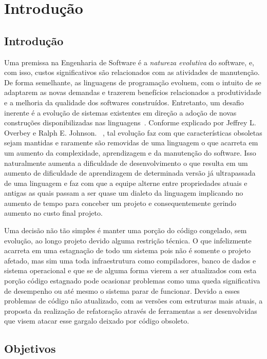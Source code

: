 \chapter{Introdução}
\section{Introdução}
Uma premissa na Engenharia de Software é a \emph{natureza evolutiva} do software, e, com isso, 
custos significativos são relacionados com as atividades de manutenção. De forma semelhante, 
as linguagens de programação evoluem, com o intuito de se adaptarem as novas demandas e trazerem 
benefícios relacionados a produtividade e a melhoria da qualidade dos softwares construídos. Entretanto, um 
desafio inerente é a evolução de sistemas existentes em direção a adoção de novas construções 
disponibilizadas nas linguagens~\cite{Dyer:2013}. Conforme explicado por Jeffrey L. Overbey e Ralph E. Johnson. ~\cite{Overbey:2009}, tal evolução faz com que características obsoletas sejam mantidas e raramente são removidas de uma linguagem o que acarreta em um aumento da complexidade, aprendizagem e da manutenção do software. Isso naturalmente aumenta a dificuldade de desenvolvimento o que resulta em um aumento de dificuldade de aprendizagem de determinada versão já ultrapassada de uma linguagem e faz com que a equipe alterne entre propriedades atuais e antigas as quais passam a ser quase um dialeto da linguagem implicando no aumento de tempo para conceber um projeto e consequentemente gerindo aumento no custo final projeto.

Uma decisão não tão simples é manter uma porção do código congelado, sem evolução, ao longo projeto devido alguma restrição técnica. O que infelizmente acarreta em uma estagnação de todo um sistema pois não é somente o projeto afetado, mas sim uma toda infraestrutura como compiladores, banco de dados e sistema operacional e que se de alguma forma vierem a ser atualizados com esta porção código estagnado pode ocasionar problemas como uma queda significativa de desempenho ou até mesmo o sistema parar de funcionar. Devido a esses problemas de código não atualizado, com as versões com estruturas mais atuais, a proposta da realização de refatoração através de ferramentas a ser desenvolvidas que visem atacar esse gargalo deixado por código obsoleto.

\section{Objetivos}
	

